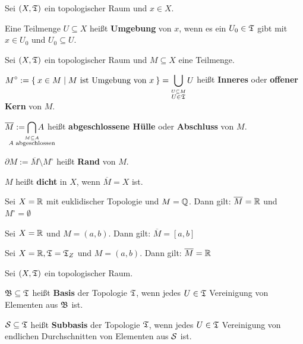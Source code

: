 \begin{definition}%
    Sei $(X, \mathfrak{T})$ ein topologischer Raum und $x \in X$.

    Eine Teilmenge $U \subseteq X$ heißt \textbf{Umgebung} von $x$,
    wenn es ein $U_0 \in \mathfrak{T}$ gibt mit $x \in U_0$ und $U_0 \subseteq U$.
\end{definition}

\begin{definition}%
    Sei $(X, \mathfrak{T})$ ein topologischer Raum und $M \subseteq X$ eine Teilmenge.
    \begin{defenum}
        \item $\displaystyle M^\circ := \Set{x \in M | M \text{ ist Umgebung von } x} = \bigcup_{\overset{U \subseteq M} {U \in \mathfrak{T}}} U $ heißt \textbf{Inneres} oder \textbf{ offener Kern} von $M$.  
        \item $\displaystyle \overline{M} := \bigcap_{\mathclap{\overset{M \subseteq A}{A \text{ abgeschlossen}}}} A$ heißt \textbf{abgeschlossene Hülle} oder \textbf{Abschluss} von $M$. 
        \item $\partial M := \overline{M} \setminus M^\circ$ heißt \textbf{Rand} von $M$. 
        \item $M$ heißt \textbf{dicht} in $X$, wenn $\overline{M} = X$ ist. 
    \end{defenum}
\end{definition}

\begin{beispiel}
    \begin{bspenum}
        \item Sei $X = \mathbb{R}$ mit euklidischer Topologie und 
              $M = \mathbb{Q}$. Dann gilt: $\overline{M} = \mathbb{R}$ und 
              $M^\circ = \emptyset$
        \item Sei $X = \mathbb{R}$ und $M=(a,b)$. Dann gilt: 
              $\overline{M} = [a,b]$
        \item Sei $X = \mathbb{R}, \mathfrak{T} = \mathfrak{T}_Z$ und $M = (a,b)$. Dann gilt:
              $\overline{M} = \mathbb{R}$
    \end{bspenum}
\end{beispiel}

\begin{definition}%
    Sei $(X, \mathfrak{T})$ ein topologischer Raum.
    \begin{defenum}
        \item $\mathfrak{B} \subseteq \mathfrak{T}$ heißt \textbf{Basis} der Topologie $\mathfrak{T}$,
              wenn jedes $U \in \mathfrak{T}$ Vereinigung von Elementen aus $\mathfrak{B}$
              ist.
        \item $\mathcal{S} \subseteq \mathfrak{T}$ heißt \textbf{Subbasis} der Topologie $\mathfrak{T}$, wenn jedes
              $U \in \mathfrak{T}$ Vereinigung von endlichen Durchschnitten
              von Elementen aus $\mathcal{S}$ ist.
    \end{defenum}
\end{definition}

